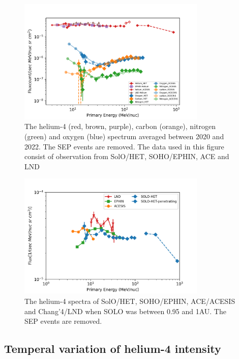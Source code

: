 \begin{figure}
    \centering
    \includegraphics[width = 0.8\textwidth]{images/ACR/ACE_SIS_CRIS_SOLO_all_3.png}
    \caption[The quite time spactra of helium, carbon, nitrogen and oxygen between 2020 and 2022]{The helium-4 (red, brown, purple), carbon (orange), nitrogen (green) and oxygen (blue) spectrum averaged between 2020 and 2022. The \ac{SEP} events are removed. The data used in this figure consist of observation from \ac{SolO}/\ac{HET}, \ac{SOHO}/\ac{EPHIN}, \ac{ACE} and \ac{LND}}
    \label{fig:overview}
\end{figure}
\begin{figure}
    \centering
    \includegraphics[width = 0.8\textwidth]{images/ACR/1AU_comparison_ACE_EPHIN_SOLO_SEP_version2.png}
    \caption[The helium spectra during the period \ac{SolO} between 0.95 and 1 au]{The helium-4 spectra of \ac{SolO}/\ac{HET}, \ac{SOHO}/\ac{EPHIN}, \ac{ACE}/\ac{ACESIS} and Chang'4/\ac{LND} when SOLO was between 0.95 and 1AU. The \ac{SEP} events are removed.}
    \label{fig:helium_spec_1au}
\end{figure}

\subsection*{Temperal variation of helium-4 intensity}

